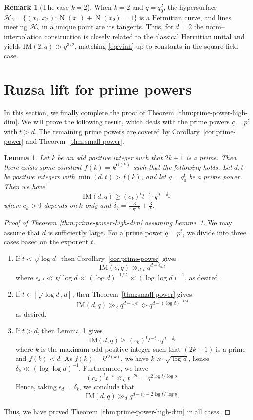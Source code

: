 \documentclass[12pt,reqno]{amsart}
\theoremstyle{plain}
\newtheorem{lemma}[theorem]{Lemma}
\theoremstyle{definition}
\newtheorem{remark}[theorem]{Remark}
\newcommand{\IM}{\mathrm{IM}}
\newcommand{\1}{\mathbf{1}}
\DeclareMathOperator{\Norm}{N}
\begin{document}
\begin{remark}[The case $k=2$]
When $k=2$ and $q=q_0^2$, the hypersurface $\mathcal{H}_2=\{(x_1,x_2):\Norm(x_1)+\Norm(x_2)=1\}$ is a Hermitian curve,
and lines meeting $\mathcal{H}_2$ in a unique point are its tangents.
Thus, for $d=2$ the norm--interpolation construction is closely related to the classical Hermitian unital and yields
$\IM(2,q)\gg q^{3/2}$, matching \eqref{eq:vinh} up to constants in the square-field case.
\end{remark}

\section{Ruzsa lift for prime powers} \label{sec:Ruzsa-prime-powers}

In this section, we finally complete the proof of Theorem~\ref{thm:prime-power-high-dim}. We will prove the following result, which deals with the prime powers $q = p^t$ with $t > d$. The remaining prime powers are covered by Corollary~\ref{cor:prime-power} and Theorem~\ref{thm:small-power}. 
\begin{lemma}
\label{lem:prime-power-high-dim-final-piece}
Let $k$ be an odd positive integer such that $2k + 1$ is a prime. Then there exists some constant $f(k) = k^{O(k)}$ such that the following holds. Let $d, t$ be positive integers with $\min(d, t) > f(k)$, and let $q = q_0^t$ be a prime power. Then we have 
$$\IM(d, q) \geq  (c_k)^t t^{-t} \cdot q^{d - \delta_k}$$
where $c_k > 0$ depends on $k$ only and $\delta_k = \frac{3}{\log k} + \frac{3}{k}$.
\end{lemma}
\begin{proof}[Proof of Theorem~\ref{thm:prime-power-high-dim} assuming Lemma~\ref{lem:prime-power-high-dim-final-piece}]
We may assume that $d$ is sufficiently large. For a prime power $q = p^t$, we divide into three cases based on the exponent $t$.
\begin{enumerate}
    \item If $t < \sqrt{\log d}$, then Corollary~\ref{cor:prime-power} gives
    $$\IM(d, q) \gg_{d, t} q^{d - \epsilon_{d, t}}$$
    where $\epsilon_{d, t} \ll t / \log d \ll (\log d)^{-1/2} \ll (\log\log d)^{-1}$, as desired.

    \item If $t \in [\sqrt{\log d}, d]$, then Theorem~\ref{thm:small-power} gives
    $$\IM(d, q) \gg_{d} q^{d - 1 / t} \gg q^{d - (\log d)^{-1/2}}$$
    as desired.

    \item If $t > d$, then Lemma~\ref{lem:prime-power-high-dim-final-piece} gives
    $$\IM(d, q) \geq (c_k)^t t^{-t} \cdot q^{d - \delta_k}$$
    where $k$ is the maximum odd positive integer such that $(2k + 1)$ is a prime and $f(k) < d$. As $f(k) = k^{O(k)}$, we have $k \gg \sqrt{\log d}$, hence $\delta_k \ll (\log\log d)^{-1}$. Furthermore, we have
    $$(c_k)^t t^{-t} \ll_k t^{-2t} = q^{2\log t / \log p}.$$
    Hence, taking $\epsilon_d = \delta_k$, we conclude that
    $$\IM(d, q) \gg_d q^{d - \epsilon_d - 2 \log t / \log p}.$$
\end{enumerate}
Thus, we have proved Theorem~\ref{thm:prime-power-high-dim} in all cases.
\end{proof}
\end{document}
